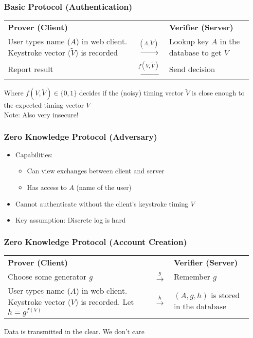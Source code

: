 \documentclass{beamer}
\begin{document}
\frame
{
  \frametitle{Basic Protocol (Authentication)}

  \begin{center}
\begin{tabular}{m{1.5in}cm{1.5in}}
\textbf{Prover (Client)} && \textbf{Verifier (Server)}\\
User types name ($A$) in web client. Keystroke vector ($\tilde V$) is recorded &$\xrightarrow{(A, \tilde V)}$ & Lookup key $A$ in the database to get $V$\\
Report result&$\xleftarrow{f(V, \tilde V)}$ & Send decision
\end{tabular}
\end{center}
\vspace{0.75in}
Where $f(V, \tilde V)\in \{0,1\}$  decides if the (noisy) timing vector $\tilde V$ is close enough to the expected timing vector $V$\\
Note: Also very insecure!

}

\frame
{
  \frametitle{Zero Knowledge Protocol (Adversary)}
  \begin{itemize}
    \item<1-> Capabilities:
      \begin{itemize}
      \item<2-> Can view exchanges between client and server 
      \item<3-> Has access to $A$ (name of the user)
    \end{itemize}
    \item<4-> Cannot authenticate without the client's keystroke timing $V$
    \item<5-> Key assumption: Discrete log is hard
  \end{itemize}

}

\frame
{
  \frametitle{Zero Knowledge Protocol (Account Creation)}

  \begin{center}
\begin{tabular}{m{1.5in}cm{1.5in}}
\textbf{Prover (Client)} && \textbf{Verifier (Server)}\\
Choose some generator $g$ & $\xrightarrow{g}$ & Remember $g$\\
User types name ($A$) in web client. Keystroke vector ($V$) is recorded. Let $h = g^{f(V)}$ &$\xrightarrow{h}$ & $(A,g,h)$ is stored in the database
\end{tabular}
\end{center}
\vspace{1in}
Data is transmitted in the clear. We don't care

}
\end{document}
